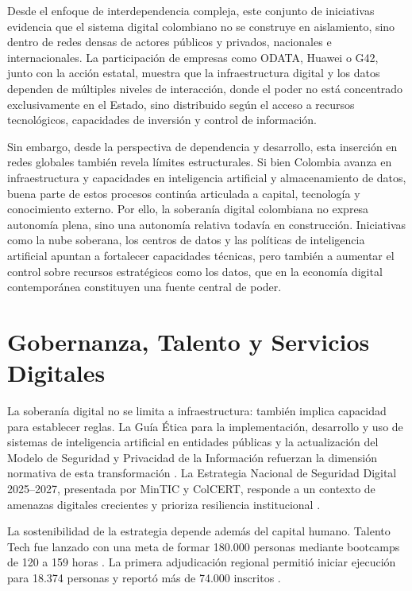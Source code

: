 \documentclass[9pt,letterpaper,twocolumn,twoside,apabib]{rho-class/rho}
\begin{document}
Desde el enfoque de interdependencia compleja, este conjunto de iniciativas evidencia que el sistema digital colombiano no se construye en aislamiento, sino dentro de redes densas de actores públicos y privados, nacionales e internacionales. La participación de empresas como ODATA, Huawei o G42, junto con la acción estatal, muestra que la infraestructura digital y los datos dependen de múltiples niveles de interacción, donde el poder no está concentrado exclusivamente en el Estado, sino distribuido según el acceso a recursos tecnológicos, capacidades de inversión y control de información.

Sin embargo, desde la perspectiva de dependencia y desarrollo, esta inserción en redes globales también revela límites estructurales. Si bien Colombia avanza en infraestructura y capacidades en inteligencia artificial y almacenamiento de datos, buena parte de estos procesos continúa articulada a capital, tecnología y conocimiento externo. Por ello, la soberanía digital colombiana no expresa autonomía plena, sino una autonomía relativa todavía en construcción. Iniciativas como la nube soberana, los centros de datos y las políticas de inteligencia artificial apuntan a fortalecer capacidades técnicas, pero también a aumentar el control sobre recursos estratégicos como los datos, que en la economía digital contemporánea constituyen una fuente central de poder.

\section{Gobernanza, Talento y Servicios Digitales}

La soberanía digital no se limita a infraestructura: también implica capacidad para establecer reglas. La Guía Ética para la implementación, desarrollo y uso de sistemas de inteligencia artificial en entidades públicas y la actualización del Modelo de Seguridad y Privacidad de la Información refuerzan la dimensión normativa de esta transformación \parencite{dnp_guia_etica_ia_2025,mintic_guia_etica_ia_2026,mintic_mspi_resolucion_02277_2025}. La Estrategia Nacional de Seguridad Digital 2025--2027, presentada por MinTIC y ColCERT, responde a un contexto de amenazas digitales crecientes y prioriza resiliencia institucional \parencite{mintic_seguridad_digital_2025}.

La sostenibilidad de la estrategia depende además del capital humano. Talento Tech fue lanzado con una meta de formar 180.000 personas mediante bootcamps de 120 a 159 horas \parencite{mintic_talento_tech_lanzamiento_2023}. La primera adjudicación regional permitió iniciar ejecución para 18.374 personas y reportó más de 74.000 inscritos \parencite{mintic_talento_tech_regiones_2023}.
\end{document}
